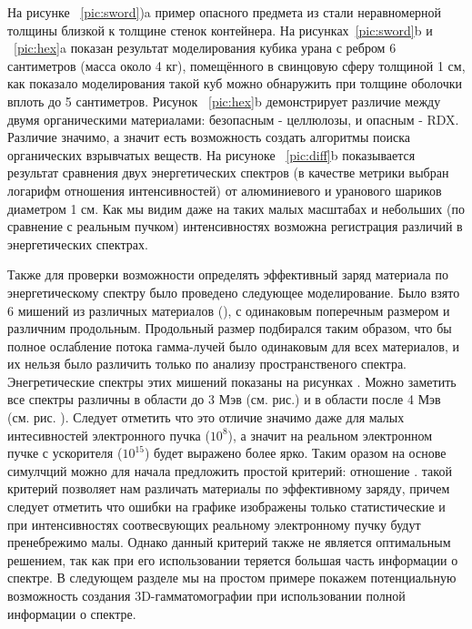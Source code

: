 \documentclass[a4paper]{panl}
\begin{document}
На рисунке ~\ref{pic:sword})a пример опасного предмета из стали неравномерной толщины близкой к толщине стенок контейнера. На рисунках~\ref{pic:sword}b и ~\ref{pic:hex}a  показан результат  моделирования кубика урана с ребром 6 сантиметров (масса около 4 кг), помещённого в свинцовую сферу толщиной 1 см, как показало моделирования такой куб можно обнаружить при толщине оболочки вплоть до 5 сантиметров. Рисунок ~\ref{pic:hex}b демонстрирует различие между двумя органическими материалами: безопасным - целлюлозы, и опасным  - RDX. Различие значимо, а значит есть возможность создать алгоритмы поиска органических взрывчатых веществ. На рисуноке ~\ref{pic:diff}b  показывается результат сравнения двух энергетических спектров (в  качестве метрики выбран логарифм отношения интенсивностей) от алюминиевого и уранового шариков диаметром 1 см. Как мы видим даже на таких малых масштабах и небольших (по сравнение с реальным пучком) интенсивностях возможна регистрация различий в энергетических спектрах.

Также для проверки возможности определять эффективный заряд материала по энергетическому спектру было проведено
следующее моделирование. Было взято 6 мишений из различных материалов (), с одинаковым поперечным размером и
 различним продольным. Продольный размер подбирался таким образом, что бы полное ослабление потока гамма-лучей было
одинаковым для всех материалов, и их нельзя было различить только по анализу пространственого спектра.
Энегретические спектры этих мишений показаны на рисунках . Можно заметить все спектры различны в области до 3 Мэв
(см. рис.) и в области после 4 Мэв (см. рис. ). Следует отметить что это отличие значимо даже для малых интесивностей
электронного  пучка ($10^8$), а значит на реальном электронном пучке с ускорителя ($10^{15}$)
будет выражено более ярко. Таким оразом на основе симулчций можно для начала предложить простой критерий: 
отношение . такой критерий позволяет нам различать материалы по эффективному заряду, 
причем следует отметить что ошибки на графике изображены только статистические и при интенсивностях соотвесвующих
реальному электронному пучку будут пренебрежимо малы. Однако данный критерий также не является оптимальным решением,
так как при его  использовании теряется большая часть информации о спектре. В следующем разделе
мы на простом примере покажем потенциальную возможность создания 
3D-гамматомографии при использовании полной информации о спектре.
\end{document}
